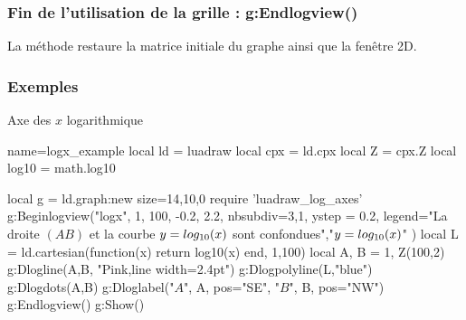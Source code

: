 \subsubsection{Fin de l'utilisation de la grille : g:Endlogview()}

La méthode  restaure la  matrice initiale du graphe ainsi que la fenêtre 2D.

\subsubsection{Exemples}

\begin{demo}{Axe des $x$ logarithmique}
\begin{luadraw}{name=logx_example}
local ld = luadraw
local cpx = ld.cpx
local Z = cpx.Z
local log10 = math.log10

local g = ld.graph:new{ size={14,10,0} }
require 'luadraw_log_axes'
g:Beginlogview("logx", 1, 100, -0.2, 2.2, {
   nbsubdiv={3,1},
   ystep = 0.2,
   legend={"La droite $(AB)$ et la courbe $y=\\log_{10}(x)$ sont confondues","$y=\\log_{10}(x)$"}
})
local L = ld.cartesian(function(x) return log10(x) end, 1,100)
local A, B = 1, Z(100,2)
g:Dlogline(A,B, "Pink,line width=2.4pt")
g:Dlogpolyline(L,"blue") 
g:Dlogdots({A,B})
g:Dloglabel("$A$", A, {pos="SE"}, "$B$", B, {pos="NW"})
g:Endlogview()
g:Show()
\end{luadraw}
\end{demo}

